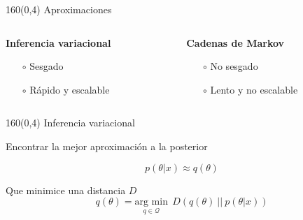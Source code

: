 \documentclass[shownotes,aspectratio=169]{beamer}
\begin{document}
\begin{frame}[plain]
\begin{textblock}{160}(0,4)
 \Large \centering Aproximaciones
\end{textblock}


\begin{columns}[t]
\begin{column}{0.5\textwidth}
 \centering \textbf{Inferencia variacional}
 
\begin{itemize}
  \item[$\circ$] Sesgado
  \item[$\circ$] R\'apido y escalable
 \end{itemize}

 
 \end{column}
 \begin{column}{0.5\textwidth}
\centering  \textbf{Cadenas de Markov}

\begin{itemize}
  \item[$\circ$] No sesgado
  \item[$\circ$] Lento y no escalable
 \end{itemize}

\end{column}
\end{columns}


\end{frame}


\begin{frame}[plain]
\begin{textblock}{160}(0,4)
\centering \Large Inferencia variacional
\end{textblock}

Encontrar la mejor aproximaci\'on a la posterior

\begin{equation*}
 p(\theta|x) \approx q(\theta)
\end{equation*}

\vspace{0.3cm}
Que minimice una distancia $D$
\begin{equation*}
 q(\theta) = \underset{q \in \mathcal{Q}}{\text{arg min}} \ \ D(q(\theta) \ || \ p(\theta|x))
\end{equation*}
\end{frame}
 
 
\end{document}
